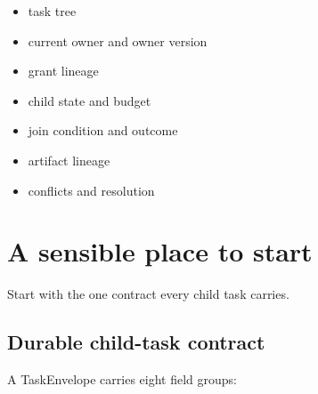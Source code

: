 \begin{itemize}

\item task tree

\item current owner and owner version

\item grant lineage

\item child state and budget

\item join condition and outcome

\item artifact lineage

\item conflicts and resolution

\end{itemize}

\section{A sensible place to start}

Start with the one contract every child task carries.\par

\subsection{Durable child-task contract}

A TaskEnvelope carries eight field groups:\par

